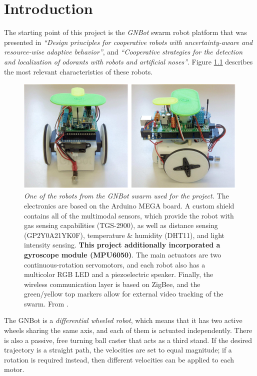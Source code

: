 \documentclass[12pt,twoside]{report}
\begin{document}
\fancyhead[LE,RO]{\slshape}
\fancyhead[LO,RE]{\slshape \leftmark}

\chapter{Introduction}

The starting point of this project is the \emph{GNBot} swarm robot platform that was presented in \emph{``Design principles for cooperative robots with uncertainty-aware and resource-wise adaptive behavior''}\cite{GarciaSauraLM14}, and \emph{``Cooperative strategies for the detection and localization of odorants with robots and artificial noses''}\cite{GarciaSaura14}.
Figure \ref{fig:GNBotViews} describes the most relevant characteristics of these robots.


\begin{figure}[hbtp]
\centerline{
\includegraphics[width=0.8\linewidth]{GNBot_views}}
\caption[One of the robots from the GNBot swarm used for the project]{\emph{One of the robots from the GNBot swarm used for the project.}
The electronics are based on the Arduino MEGA board. A custom shield contains all of the multimodal sensors, which provide the robot with gas sensing capabilities (TGS-2900), as well as distance sensing (GP2Y0A21YK0F), temperature \& humidity (DHT11), and light intensity sensing.
\textbf{This project additionally incorporated a gyroscope module (MPU6050)}.
The main actuators are two continuous-rotation servomotors, and each robot also has a multicolor RGB LED and a piezoelectric speaker.
Finally, the wireless communication layer is based on ZigBee, and the green/yellow top markers allow for external video tracking of the swarm.
From \cite{GarciaSauraLM14,GarciaSaura14}.
}
\label{fig:GNBotViews}
\end{figure}


The GNBot is a \emph{differential wheeled robot}, which means that it has two active wheels sharing the same axis, and each of them is actuated independently. There is also a passive, free turning ball caster that acts as a third stand. If the desired trajectory is a straight path, the velocities are set to equal magnitude; if a rotation is required instead, then different velocities can be applied to each motor.
\end{document}
